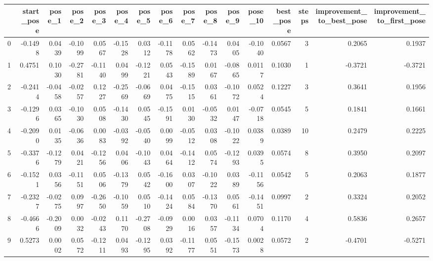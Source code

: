 \begin{tabular}{lrrrrrrrrrrrrrrr}
\toprule
{} &  start\_pose &  pose\_1 &  pose\_2 &  pose\_3 &  pose\_4 &  pose\_5 &  pose\_6 &  pose\_7 &  pose\_8 &  pose\_9 &  pose\_10 &  best\_pose &  steps &  improvement\_to\_best\_pose &  improvement\_to\_first\_pose \\
\midrule
0   &     -0.1498 &  0.0439 & -0.1099 &  0.0567 & -0.1528 &  0.0312 & -0.1178 &  0.0562 & -0.1473 &  0.0405 &  -0.1040 &     0.0567 &      3 &                    0.2065 &                     0.1937 \\
1   &      0.4751 &  0.1030 & -0.2781 & -0.1140 &  0.0499 & -0.1221 &  0.0543 & -0.1589 &  0.0167 & -0.0865 &   0.0117 &     0.1030 &      1 &                   -0.3721 &                    -0.3721 \\
2   &     -0.2414 & -0.0458 & -0.0257 &  0.1227 & -0.2569 & -0.0669 &  0.0475 & -0.1515 &  0.0361 & -0.1072 &   0.0524 &     0.1227 &      3 &                    0.3641 &                     0.1956 \\
3   &     -0.1296 &  0.0365 & -0.1030 &  0.0508 & -0.1430 &  0.0545 & -0.1591 &  0.0130 & -0.0532 &  0.0147 &  -0.0718 &     0.0545 &      5 &                    0.1841 &                     0.1661 \\
4   &     -0.2090 &  0.0135 & -0.0636 &  0.0083 & -0.0392 & -0.0540 &  0.0099 & -0.0512 &  0.0308 & -0.1022 &   0.0389 &     0.0389 &     10 &                    0.2479 &                     0.2225 \\
5   &     -0.3376 & -0.1279 &  0.0421 & -0.1256 &  0.0406 & -0.1043 &  0.0464 & -0.1412 &  0.0574 & -0.1293 &   0.0395 &     0.0574 &      8 &                    0.3950 &                     0.2097 \\
6   &     -0.1521 &  0.0356 & -0.1151 &  0.0506 & -0.1379 &  0.0542 & -0.1600 &  0.0307 & -0.1022 &  0.0389 &  -0.1156 &     0.0542 &      5 &                    0.2063 &                     0.1877 \\
7   &     -0.2327 & -0.0275 &  0.0997 & -0.2650 & -0.1059 &  0.0510 & -0.1424 &  0.0584 & -0.1370 &  0.0561 &  -0.1451 &     0.0997 &      2 &                    0.3324 &                     0.2052 \\
8   &     -0.4666 & -0.2009 &  0.0032 & -0.0243 &  0.1170 & -0.2708 & -0.0929 &  0.0016 &  0.0357 & -0.1134 &   0.0704 &     0.1170 &      4 &                    0.5836 &                     0.2657 \\
9   &      0.5273 &  0.0002 &  0.0572 & -0.1211 &  0.0493 & -0.1295 &  0.0392 & -0.1177 &  0.0551 & -0.1573 &   0.0028 &     0.0572 &      2 &                   -0.4701 &                    -0.5271 \\

\end{tabular}
